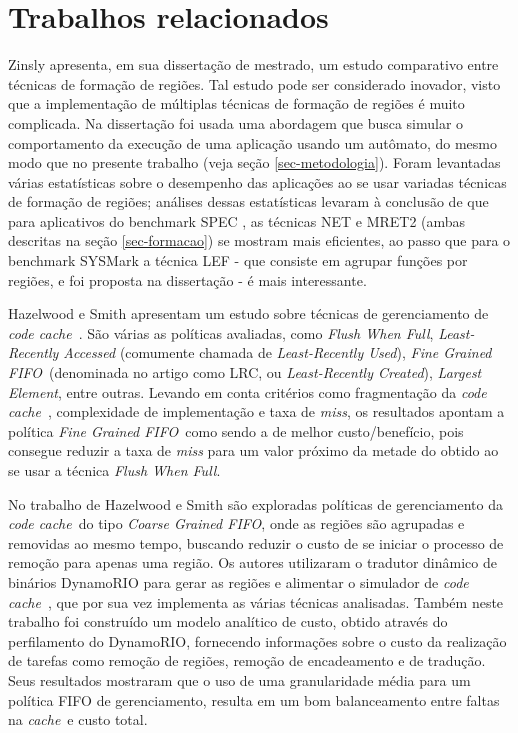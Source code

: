 \documentclass[12pt,twoside]{article}
\newcommand{\ccache}{\emph{code cache}}
\newcommand{\cache}{\emph{cache}}
\newcommand{\flush}{\emph{Flush When Full}}
\newcommand{\finefifo}{\emph{Fine Grained FIFO}}
\newcommand{\coarsefifo}{\emph{Coarse Grained FIFO}}
\begin{document}
\section{Trabalhos relacionados}
Zinsly \cite{thesis-zinsly} apresenta, em sua dissertação de mestrado, um estudo comparativo entre técnicas de formação de regiões. Tal estudo pode ser considerado inovador, visto que a implementação de múltiplas técnicas de formação de regiões é muito complicada. Na dissertação foi usada uma abordagem que busca simular o comportamento da execução de uma aplicação usando um autômato, do mesmo modo que no presente trabalho (veja seção \ref{sec-metodologia}). Foram levantadas várias estatísticas sobre o desempenho das aplicações ao se usar variadas técnicas de formação de regiões; análises dessas estatísticas levaram à conclusão de que para aplicativos do benchmark SPEC \cite{spec-url}, as técnicas NET e MRET2 (ambas descritas na seção \ref{sec-formacao}) se mostram mais eficientes, ao passo que para o benchmark SYSMark \cite{sysmark-url} a técnica LEF - que consiste em agrupar funções por regiões, e foi proposta na dissertação - é mais interessante. 

Hazelwood e Smith \cite{hazelwood-2002} apresentam um estudo sobre técnicas de gerenciamento de \ccache~. São várias as políticas avaliadas, como \flush, \emph{Least-Recently Accessed} (comumente chamada de \emph{Least-Recently Used}), \finefifo~(denominada no artigo como LRC, ou \emph{Least-Recently Created}),\emph{ Largest Element}, entre outras. Levando em conta critérios como fragmentação da \ccache~, complexidade de implementação e taxa de \emph{miss}, os resultados apontam a política \finefifo~como sendo a de melhor custo/benefício, pois consegue reduzir a taxa de \emph{miss} para um valor próximo da metade do obtido ao se usar a técnica \flush.

No trabalho de Hazelwood e Smith \cite{kim-2004} são exploradas políticas de gerenciamento da \ccache~do tipo \coarsefifo, onde as regiões são agrupadas e removidas ao mesmo tempo, buscando reduzir o custo de se iniciar o processo de remoção para apenas uma região. Os autores utilizaram o tradutor dinâmico de binários DynamoRIO \cite{dynamorio-url} para gerar as regiões e alimentar o simulador de \ccache~, que por sua vez implementa as várias técnicas analisadas. Também neste trabalho foi construído um modelo analítico de custo, obtido através do perfilamento do DynamoRIO, fornecendo informações sobre o custo da realização de tarefas como remoção de regiões, remoção de encadeamento e de tradução. Seus resultados mostraram que o uso de uma granularidade média para um política FIFO de gerenciamento, resulta em um bom balanceamento entre faltas na \cache~e custo total.
\end{document}
